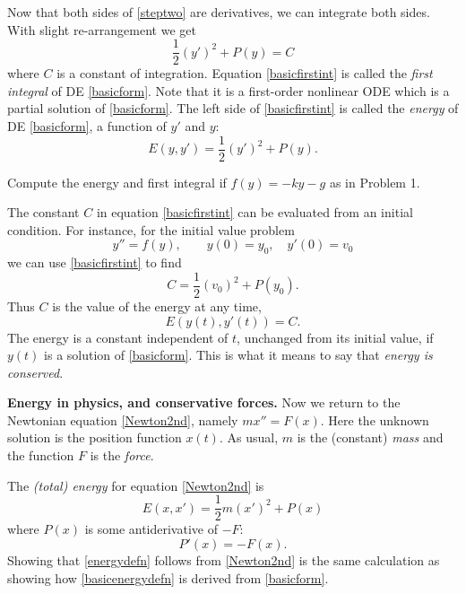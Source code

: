 \documentclass[12pt]{article}
\theoremstyle{definition}
\begin{document}
Now that both sides of \eqref{steptwo} are derivatives, we can integrate both sides.  With slight re-arrangement we get
\begin{equation}
  \frac{1}{2} (y')^2 + P(y) = C  \label{basicfirstint}
\end{equation}
where $C$ is a constant of integration.  Equation \eqref{basicfirstint} is called the \emph{first integral} of DE \eqref{basicform}.  Note that it is a first-order nonlinear ODE which is a partial solution of \eqref{basicform}.  The left side of \eqref{basicfirstint} is called the \emph{energy} of DE \eqref{basicform}, a function of $y'$ and $y$:
\begin{equation}
  E(y,y') = \frac{1}{2} (y')^2 + P(y).  \label{basicenergydefn}
\end{equation}

\begin{prob}
Compute the energy and first integral if $f(y)=-ky-g$ as in Problem 1.
\end{prob}

The constant $C$ in equation \eqref{basicfirstint} can be evaluated from an initial condition.  For instance, for the initial value problem
    $$y''=f(y), \qquad y(0)=y_0, \quad y'(0)=v_0$$
we can use \eqref{basicfirstint} to find
    $$C = \frac{1}{2} (v_0)^2 + P(y_0).$$
Thus $C$ is the value of the energy at any time,
    $$E(y(t),y'(t)) = C.$$
The energy is a constant independent of $t$, unchanged from its initial value, if $y(t)$ is a solution of \eqref{basicform}.  This is what it means to say that \emph{energy is conserved}.

\medskip
\textbf{Energy in physics, and conservative forces.}  Now we return to the Newtonian equation \eqref{Newton2nd}, namely $m x'' = F(x)$.  Here the unknown solution is the position function $x(t)$.  As usual, $m$ is the (constant) \emph{mass} and the function $F$ is the \emph{force}.

The \emph{(total) energy} for equation \eqref{Newton2nd} is
\begin{equation}
  E(x,x') = \frac{1}{2} m (x')^2 + P(x)  \label{energydefn}
\end{equation}
where $P(x)$ is some antiderivative of $-F$:
\begin{equation}
P'(x)=-F(x).  \label{potentialfunction}
\end{equation}
Showing that \eqref{energydefn} follows from \eqref{Newton2nd} is the same calculation as showing how \eqref{basicenergydefn} is derived from \eqref{basicform}.
\end{document}
